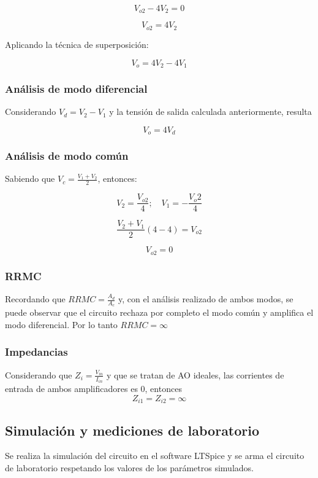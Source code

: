 \[V_{o2} - 4V_2 = 0 \]

\[V_{o2}=4V_2\]

Aplicando la técnica de superposición:

\[V_o = 4V_2  - 4V_1 \]
      
\subsubsection{Análisis de modo diferencial }

Considerando $V_d = V_2 -V_1$ y la tensión de salida calculada anteriormente, resulta

\[ V_o = 4V_d \]
      
\subsubsection{Análisis de modo común}

Sabiendo que $V_c = \frac{V_1 + V_2}{2} $, entonces:

\[ V_2 = \frac{V_{o2}}{4}; \quad  V_1 = -\frac{V_o2}{4} \]

\[ \frac{V_2 +V_1}{2}(4-4) =V_{o2} \]

\[V_{o2} = 0 \]

\subsubsection{RRMC}
Recordando que $RRMC = \frac{A_d}{A_c}$ y, con el análisis realizado de ambos modos, se puede observar que el circuito rechaza por completo el modo común y amplifica el modo diferencial. 
Por lo tanto $RRMC = \infty$

\subsubsection{Impedancias}

Considerando que $Z_i = \frac{V_{in}}{I_{in}} $ y que se tratan de AO ideales, las corrientes de entrada de ambos amplificadores es 0, entonces
\[Z_{i1}=Z_{i2} = \infty \]

\vspace{1em}

\subsection{Simulación y mediciones de laboratorio}

Se realiza la simulación del circuito en el software LTSpice y se arma el circuito de laboratorio respetando los valores de los parámetros simulados.


